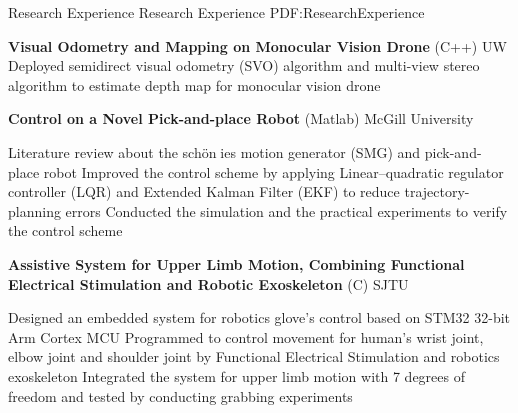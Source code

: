 \documentclass[letterpaper,MMMyyyy,nonstopmode]{simpleresumecv}
\begin{document}
\begin{Body}

\Section
{Research Experience}
{Research Experience}
{PDF:ResearchExperience}


\Entry
{\textbf{Visual Odometry and Mapping on Monocular Vision Drone}} (C++)
\hfill UW
\Gap
\BulletItem
Deployed semidirect visual odometry (SVO) algorithm and multi-view stereo algorithm to estimate depth map for monocular vision drone


\Gap




\Entry
{\textbf{Control on a Novel Pick-and-place Robot}} (Matlab)
\hfill McGill University

\Gap
\BulletItem
Literature review about the schönies motion generator (SMG) and pick-and-place robot
\BulletItem
Improved the control scheme by applying Linear–quadratic regulator controller (LQR)  and Extended Kalman Filter (EKF) to reduce trajectory-planning errors
\BulletItem
Conducted the simulation and the practical experiments to verify the control scheme

\Gap
{\textbf{Assistive System for Upper Limb Motion, Combining Functional Electrical Stimulation and Robotic Exoskeleton}} (C)
\hfill SJTU

\Gap
\BulletItem
Designed an embedded system for robotics glove’s control based on STM32 32-bit Arm Cortex MCU
\BulletItem
Programmed to control movement for human’s wrist joint, elbow joint and shoulder joint by Functional Electrical Stimulation and robotics exoskeleton
\BulletItem
Integrated the system for upper limb motion with 7 degrees of freedom and tested by conducting grabbing  experiments

\Gap


\end{Body}
\end{document}
